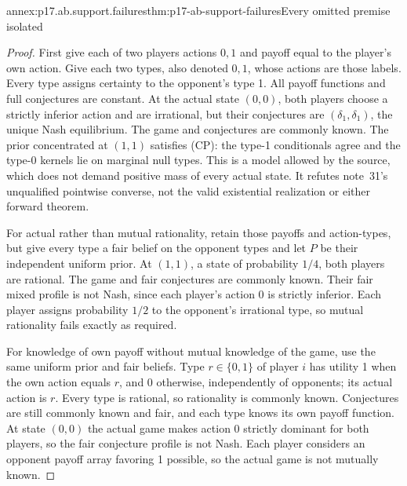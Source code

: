 \begin{annexitem}{annex:p17.ab.support.failures}{thm:p17-ab-support-failures}{Every omitted premise isolated}
\begin{proof}
First give each of two players actions \(0,1\) and payoff
equal to the player's own action. Give each two types,
also denoted \(0,1\), whose actions are those labels.
Every type assigns certainty to the opponent's type 1.
All payoff functions and full conjectures are constant.
At the actual state \((0,0)\), both players choose a strictly
inferior action and are irrational, but their conjectures
are \((\delta_1,\delta_1)\), the unique Nash equilibrium.
The game and conjectures are commonly known. The prior
concentrated at \((1,1)\) satisfies (CP): the type-1
conditionals agree and the type-0 kernels lie on marginal
null types. This is a model allowed by the source, which
does not demand positive mass of every actual state.
It refutes note~31's unqualified pointwise converse, not
the valid existential realization or either forward theorem.

For actual rather than mutual rationality, retain those
payoffs and action-types, but give every type a fair belief
on the opponent types and let \(P\) be their independent
uniform prior. At \((1,1)\), a state of probability \(1/4\),
both players are rational. The game and fair conjectures
are commonly known. Their fair mixed profile is not Nash,
since each player's action 0 is strictly inferior.
Each player assigns probability \(1/2\) to the opponent's
irrational type, so mutual rationality fails exactly as required.

For knowledge of own payoff without mutual knowledge of
the game, use the same uniform prior and fair beliefs.
Type \(r\in\{0,1\}\) of player \(i\) has utility
1 when the own action equals \(r\), and 0 otherwise,
independently of opponents; its actual action is \(r\).
Every type is rational, so rationality is commonly known.
Conjectures are still commonly known and fair, and each
type knows its own payoff function. At state \((0,0)\)
the actual game makes action 0 strictly dominant for both
players, so the fair conjecture profile is not Nash.
Each player considers an opponent payoff array favoring 1
possible, so the actual game is not mutually known.


\end{proof}
\end{annexitem}
